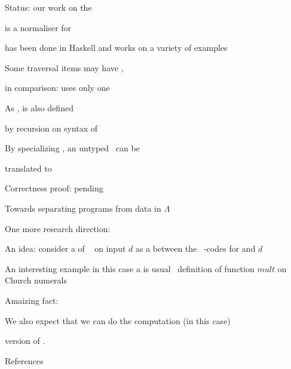 \documentclass[12pt,fleqn,landscape]{article}
\begin{document}
\begin{slide}{Status: our work on the  \lc }

\be
\ii {} is a normaliser for \brown{$\Lambda$}
\vair

\ii {} has been done in {\sc Haskell} and works on a variety of 
  examples
\vair

\ii Some traversal items may have ,

  \hfill in comparison:  uses only one
\vair

\ii As ,  is also defined  

  \hfill by recursion on syntax of \lexp\  
\vair

\ii By specializing , an  untyped \lexp\  can be 

  translated to 
\vair

\ii Correctness proof: pending
\ee

\end{slide}


\begin{slide}{Towards separating programs from data in $\Lambda$}

One more research direction:

\bi
\vair\vair

\ii An idea: consider a  of \lexp\  on input 
  $d$ as a  between the ~-codes for  
  and $d$
\vair\vair

\ii An interesting example in this case a is usual \lc\  definition of 
  function $mult$ on Church numerals

  \bi
  \ii Amaizing fact: 
  \vair

  \ii We also expect that we can do the computation (in this case) 

  \ei
\vair\vair

\ii {} version of .
\ei

\end{slide}

\begin{slide}{References}

\end{slide}
\end{document}
